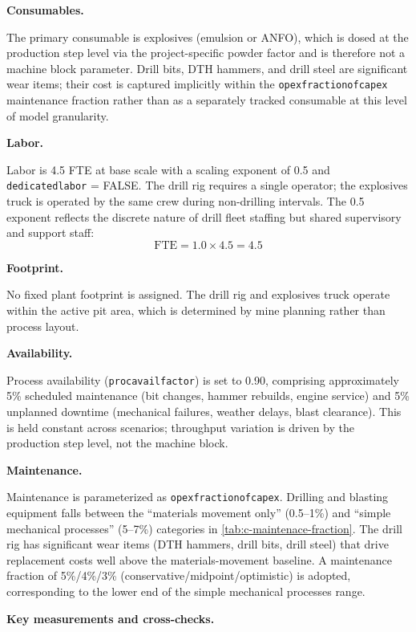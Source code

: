 \documentclass{article}
\renewcommand\_{\textunderscore\allowbreak}
\begin{document}
\medskip
\noindent\textbf{Consumables.}\quad

The primary consumable is explosives (emulsion or ANFO), which is dosed at the production step level via the project-specific powder factor and is therefore not a machine block parameter. Drill bits, DTH hammers, and drill steel are significant wear items; their cost is captured implicitly within the \texttt{opex\_fraction\_of\_capex} maintenance fraction rather than as a separately tracked consumable at this level of model granularity.

\medskip
\noindent\textbf{Labor.}\quad

Labor is 4.5 FTE at base scale with a scaling exponent of 0.5 and \texttt{dedicated\_labor} = FALSE. The drill rig requires a single operator; the explosives truck is operated by the same crew during non-drilling intervals. The 0.5 exponent reflects the discrete nature of drill fleet staffing but shared supervisory and support staff:
\[
	\text{FTE} = 1.0 \times 4.5 = 4.5
\]

\medskip
\noindent\textbf{Footprint.}\quad

No fixed plant footprint is assigned. The drill rig and explosives truck operate within the active pit area, which is determined by mine planning rather than process layout.

\medskip
\noindent\textbf{Availability.}\quad

Process availability (\texttt{proc\_avail\_factor}) is set to 0.90, comprising approximately 5\% scheduled maintenance (bit changes, hammer rebuilds, engine service) and 5\% unplanned downtime (mechanical failures, weather delays, blast clearance). This is held constant across scenarios; throughput variation is driven by the production step level, not the machine block.

\medskip
\noindent\textbf{Maintenance.}\quad

Maintenance is parameterized as \texttt{opex\_fraction\_of\_capex}. Drilling and blasting equipment falls between the ``materials movement only'' (0.5--1\%) and ``simple mechanical processes'' (5--7\%) categories in \ref{tab:c-maintenace-fraction}. The drill rig has significant wear items (DTH hammers, drill bits, drill steel) that drive replacement costs well above the materials-movement baseline. A maintenance fraction of 5\%/4\%/3\% (conservative/midpoint/optimistic) is adopted, corresponding to the lower end of the simple mechanical processes range.

\medskip
\noindent\textbf{Key measurements and cross-checks.}\quad
\end{document}
